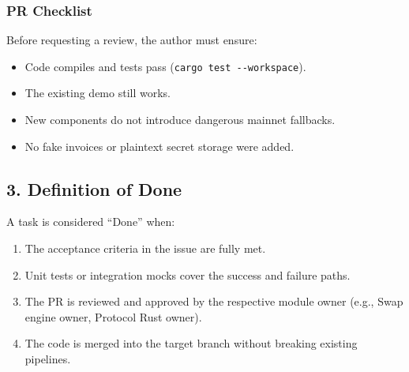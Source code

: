 \documentclass[
]{article}
\providecommand{\tightlist}{%
  \setlength{\itemsep}{0pt}\setlength{\parskip}{0pt}}
\begin{document}
\hypertarget{pr-checklist}{%
\subsubsection{PR Checklist}\label{pr-checklist}}

Before requesting a review, the author must ensure:

\begin{itemize}
\tightlist
\item[$\square$]
  Code compiles and tests pass (\texttt{cargo\ test\ -\/-workspace}).
\item[$\square$]
  The existing demo still works.
\item[$\square$]
  New components do not introduce dangerous mainnet fallbacks.
\item[$\square$]
  No fake invoices or plaintext secret storage were added.
\end{itemize}

\hypertarget{definition-of-done}{%
\subsection{3. Definition of Done}\label{definition-of-done}}

A task is considered ``Done'' when:

\begin{enumerate}
\def\labelenumi{\arabic{enumi}.}
\tightlist
\item
  The acceptance criteria in the issue are fully met.
\item
  Unit tests or integration mocks cover the success and failure paths.
\item
  The PR is reviewed and approved by the respective module owner (e.g.,
  Swap engine owner, Protocol Rust owner).
\item
  The code is merged into the target branch without breaking existing
  pipelines.
\end{enumerate}
\end{document}
